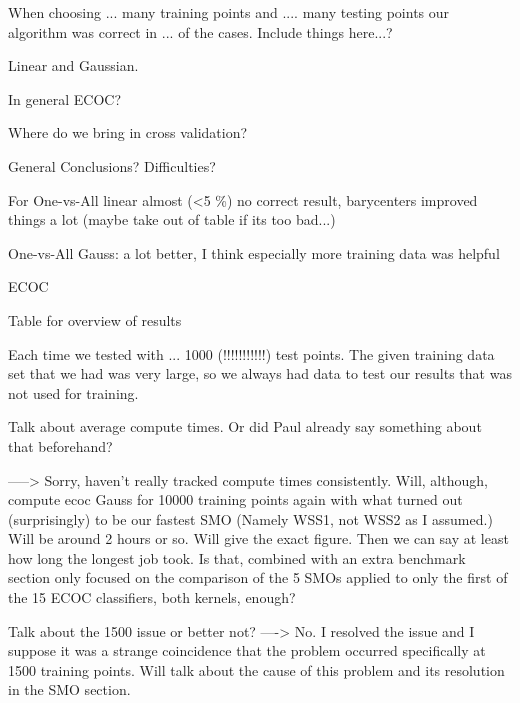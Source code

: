 When choosing ... many training points and .... many testing points our algorithm was correct in ... of the cases. Include things here...?


Linear and Gaussian.

In general ECOC?

Where do we bring in cross validation?

General Conclusions? Difficulties?

For One-vs-All linear almost (<5 \%) no correct result, barycenters improved things a lot  (maybe take out of table if its too bad...)

One-vs-All Gauss: a lot better, I think especially more training data was helpful

ECOC 

Table for overview of results 

Each time we tested with ... 1000 (!!!!!!!!!!!) test points. The given training data set that we had was very large, so we always had data to test our results that was not used for training. 

Talk about average compute times. Or did Paul already say something about that beforehand? 

----->
Sorry, haven't really tracked compute times consistently. Will, although, compute ecoc Gauss for 10000 training points again with what turned out (surprisingly) to be our fastest SMO (Namely WSS1, not WSS2 as I assumed.) Will be around 2 hours or so. Will give the exact figure. Then we can say at least how long the longest job took. Is that, combined with an extra benchmark section only focused on the comparison of the 5 SMOs applied to only the first of the  15 ECOC classifiers, both kernels, enough?


Talk about the 1500 issue or better not?
----> No. I resolved the issue and I suppose it was a strange coincidence that the problem occurred specifically at 1500 training points. Will talk about the cause of this problem and its resolution in the SMO section.


